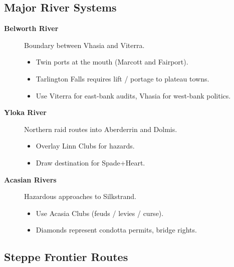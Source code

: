 \subsection{Major River Systems}\label{subsec:river_systems}

\begin{description}
    \item[\textbf{Belworth River}] Boundary between Vhasia and Viterra.
        \begin{itemize}
            \item Twin ports at the mouth (Marcott and Fairport).
            \item Tarlington Falls requires lift / portage to plateau towns.
            \item Use Viterra for east-bank audits, Vhasia for west-bank politics.
        \end{itemize}
    \item[\textbf{Yloka River}] Northern raid routes into Aberderrin and Dolmis.
        \begin{itemize}
            \item Overlay Linn Clubs for hazards.
            \item Draw destination for Spade+Heart.
        \end{itemize}
    \item[\textbf{Acasian Rivers}] Hazardous approaches to Silkstrand.
        \begin{itemize}
            \item Use Acasia Clubs (feuds / levies / curse).
            \item Diamonds represent condotta permits, bridge rights.
        \end{itemize}
\end{description}

\subsection{Steppe Frontier Routes}\label{subsec:steppe_frontiers}


